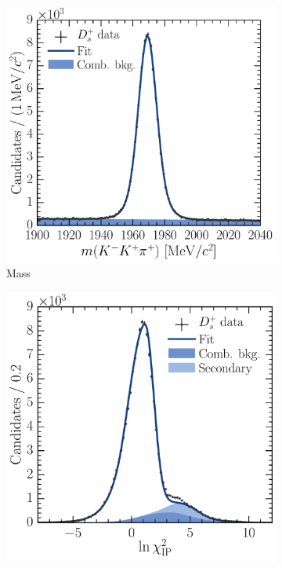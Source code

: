\begin{figure}
  \begin{subfigure}[b]{0.5\textwidth}
    \centering
    \includegraphics[width=\textwidth]{figures/production/fitting/DsToKKpi_mass_fit_pT_integrated_y_integrated}
    \caption{Mass}
    \label{fig:prod:fitting:DsToKKpi:mass}
  \end{subfigure}
  \begin{subfigure}[b]{0.5\textwidth}
    \centering
    \includegraphics[width=\textwidth]{figures/production/fitting/DsToKKpi_ipchisq_fit_pT_integrated_y_integrated}

\end{subfigure}
\end{figure}

